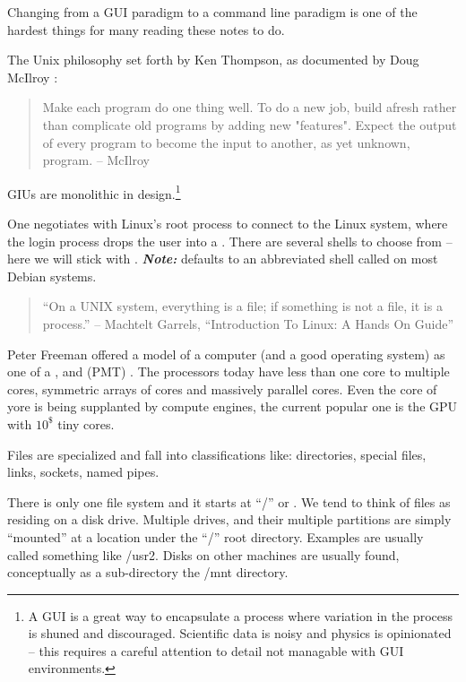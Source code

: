 \documentclass[letter,11pt,oneside]{article}
\newcommand{\dhl}[1]{{\color{verbcolor}{\texttt#1}}}
\begin{document}
Changing from a GUI paradigm to a command line paradigm is one of the
hardest things for many reading these notes to do.

The Unix philosophy set forth by Ken Thompson, as documented by Doug
McIlroy \cite{McIlroy1978,McIlloryPhilosophy}:

\begin{quote}
Make each program do one thing well. To do a new job, build afresh
rather than complicate old programs by adding new "features". Expect
the output of every program to become the input to another, as yet
unknown, program. -- McIlroy
\end{quote}

GIUs are monolithic in design.\footnote{A GUI is a great way to encapsulate
a process where variation in the process is shuned and discouraged. Scientific
data is noisy and physics is opinionated -- this requires a careful attention
to detail not managable with GUI environments.}

One negotiates with Linux's root process to connect to the Linux
system, where the login process drops the user into a \dhl{shell}. There are
several shells to choose from -- here we will stick with \dhl{bash}
. \textbf{\emph{Note:}} \dhl{/usr/sh} defaults to an abbreviated shell
called \dhl{dash} on most Debian systems. 

\begin{quote}
``On a UNIX system, everything is a file; if something is not a file, it is a process.'' --
Machtelt Garrels, ``Introduction To Linux: A Hands On Guide''
\end{quote}

Peter Freeman \cite{freeman1975software} offered a model of a computer
(and a good operating system) as one of a \dhl{Processor},
\dhl{Memory} and \dhl{Transducer} (PMT) . The
processors today have less than one core to multiple cores, symmetric
arrays of cores and massively parallel cores.  Even the core of yore
is being supplanted by compute engines, the current popular one is the
GPU with $10^{\$}$ tiny cores.

Files are specialized and fall into classifications like: directories,
special files, links, sockets, named pipes.

There is only one file system and it starts at ``/'' or \dhl{root}.
We tend to think of files as residing on a disk drive. Multiple
drives, and their multiple partitions are simply ``mounted'' at
a location under the ``/''   root directory. Examples are
usually called something like /usr2. Disks on other machines
are usually found, conceptually as a sub-directory the /mnt directory.
\end{document}
